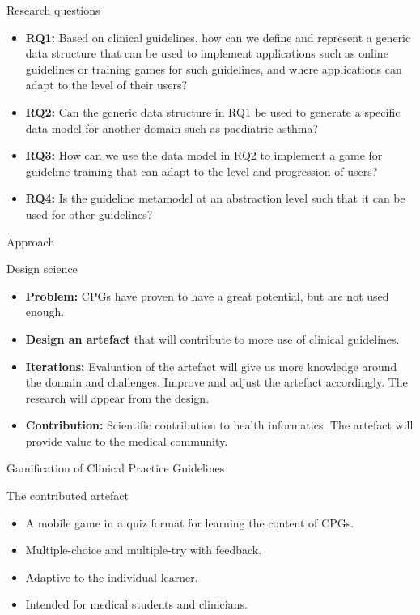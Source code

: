 \documentclass{beamer}
\begin{document}
\begin{frame}{Research questions}
\begin{itemize}
	\item \textbf{RQ1:} Based on clinical guidelines, how can we define and represent a generic data structure that can be used to implement applications such as online guidelines or training games for such guidelines, and where applications can adapt to the level of their users?
	\item \textbf{RQ2:} Can the generic data structure in RQ1 be used to generate a specific data model for another domain such as paediatric asthma?
	\item \textbf{RQ3:} How can we use the data model in RQ2 to implement a game for guideline training that can adapt to the level and progression  of users?
	\item \textbf{RQ4:} Is the guideline metamodel at an abstraction level such that it can be used for other guidelines? 
\end{itemize}
\end{frame}


\begin{frame}{Approach}
\begin{block}{Design science}
\begin{itemize}
	\item \textbf{Problem:} CPGs have proven to have a great potential, but are not used enough.
	\item \textbf{Design an artefact} that will contribute to more use of clinical guidelines.
	\item \textbf{Iterations:} Evaluation of the artefact will give us more knowledge around the domain and challenges. Improve and adjust the artefact accordingly. The research will appear from the design.
	\item \textbf{Contribution:} Scientific contribution to health informatics. The artefact will provide value to the medical community.
\end{itemize}
\end{block}
\end{frame}

\begin{frame}{Gamification of Clinical Practice Guidelines}
\begin{block}{The contributed artefact}
\begin{itemize}
	\item A mobile game in a quiz format for learning the content of CPGs.
	\item Multiple-choice and multiple-try with feedback.
	\item Adaptive to the individual learner.
	\item Intended for medical students and clinicians.
\end{itemize}
\end{block}
\end{frame}
\end{document}
